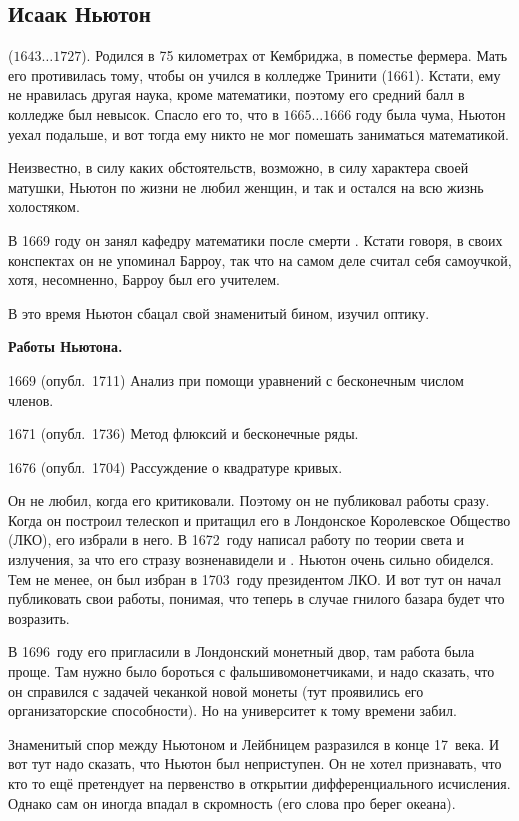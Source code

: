 \documentclass[a4paper,oneside,fleqn,10pt]{article}
\newcommand{\pe}[2]{${#1}\ldots{#2}$}
\begin{document}
\subsection{Исаак Ньютон}

 (\pe{1643}{1727}). Родился в 75 километрах
от Кембриджа, в поместье фермера. Мать его противилась тому, чтобы он учился в колледже Тринити (1661).
Кстати, ему не нравилась другая наука, кроме математики, поэтому его средний балл в колледже был невысок.
Спасло его то, что в \pe{1665}{1666} году была чума, Ньютон уехал подальше, и вот тогда ему никто не мог помешать заниматься
математикой.

Неизвестно, в силу каких обстоятельств, возможно, в силу характера своей матушки,
Ньютон по жизни не любил женщин, и так и остался на всю жизнь холостяком.

В 1669 году он занял кафедру математики после смерти .
Кстати говоря, в своих конспектах он не упоминал Барроу, так что на самом деле считал
себя самоучкой, хотя, несомненно, Барроу был его учителем.

В это время Ньютон сбацал свой знаменитый бином, изучил оптику.


\textbf{Работы Ньютона.}

1669 (опубл.~1711) Анализ при помощи уравнений с бесконечным числом членов.

1671 (опубл.~1736) Метод флюксий и бесконечные ряды.

1676 (опубл.~1704) Рассуждение о квадратуре кривых.

Он не любил, когда его критиковали. Поэтому он не публиковал работы сразу.
Когда он построил телескоп и притащил его в Лондонское Королевское Общество (ЛКО), его избрали в него.
В 1672~году написал работу по теории света и излучения, за что его стразу возненавидели  и .
Ньютон очень сильно обиделся. Тем не менее, он был избран в 1703~году президентом ЛКО. И вот тут он
начал публиковать свои работы, понимая, что теперь в случае гнилого базара будет что возразить.

В 1696~году его пригласили в Лондонский монетный двор, там работа была проще.
Там нужно было бороться с фальшивомонетчиками, и надо сказать, что он справился
с задачей чеканкой новой монеты (тут проявились его организаторские способности).
Но на университет к тому времени забил.

Знаменитый спор между Ньютоном и Лейбницем разразился в конце 17~века.
И вот тут надо сказать, что Ньютон был неприступен. Он не хотел признавать,
что кто то ещё претендует на первенство в открытии дифференциального исчисления.
Однако сам он иногда впадал в скромность (его слова про берег океана).
\end{document}
